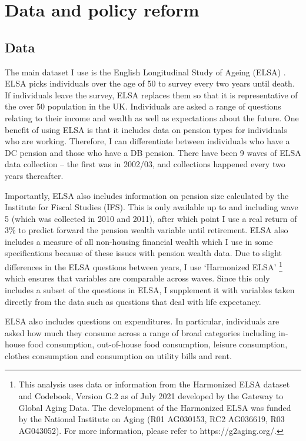 \documentclass[12pt]{article}
\begin{document}
\section{Data and policy reform}

\subsection{Data}

The main dataset I use is the English Longitudinal Study of Ageing (ELSA)
\citep{main_elsa_citation}. ELSA picks individuals over the age of 50 to survey
every two years until death. If individuals leave the survey, ELSA replaces them
so that it is representative of the over 50 population in the UK. Individuals
are asked a range of questions relating to their income and wealth as well as
expectations about the future. One benefit of using ELSA is that it includes
data on pension types for individuals who are working. Therefore, I can
differentiate between individuals who have a DC pension and those who have a DB
pension. There have been 9 waves of ELSA data collection -- the first was in
2002/03, and collections happened every two years thereafter.

Importantly, ELSA also includes information on pension size calculated by the
Institute for Fiscal Studies (IFS). This is only available up to and including
wave 5 (which was collected in 2010 and 2011), after which point I use a real return
of 3\% to predict forward the pension wealth variable until retirement. ELSA
also includes a measure of all non-housing financial wealth which I use in some
specifications because of these issues with pension wealth data. Due to slight
differences in the ELSA questions between years, I use `Harmonized ELSA'
\footnote{This analysis uses data or information from the Harmonized ELSA
    dataset and Codebook, Version G.2 as of July 2021 developed by the Gateway to
    Global Aging Data. The development of the Harmonized ELSA was funded by the
    National Institute on Aging (R01 AG030153, RC2 AG036619, R03 AG043052). For more
    information, please refer to https://g2aging.org/.} which ensures that variables
are comparable across waves. Since this only includes a subset of the questions
in ELSA, I supplement it with variables taken directly from the data such as
questions that deal with life expectancy.

ELSA also includes questions on expenditures. In particular, individuals are
asked how much they consume across a range of broad categories including
in-house food consumption, out-of-house food consumption, leisure consumption,
clothes consumption and consumption on utility bills and rent.
\end{document}
